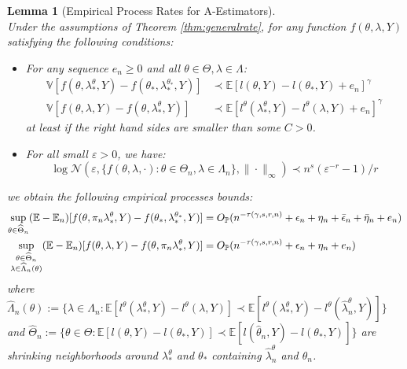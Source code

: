 \documentclass[12pt]{article}
\theoremstyle{myplain}
\newtheorem{lemma}{Lemma}[section]
\theoremstyle{definition}
\theoremstyle{definition}
\theoremstyle{remark}
\numberwithin{equation}{section}
\begin{document}
\begin{lemma}[Empirical Process Rates for A-Estimators]\label{lem:emproc} \ \\ 
Under the assumptions of Theorem \ref{thm:generalrate}, for any function $f(\theta, \lambda, Y)$ satisfying the following conditions:
\begin{itemize}
    \item For any sequence $e_n\geq0$ and all $\theta\in\Theta,\lambda\in\Lambda$: 
    \begin{align}
        \mathbb{V}[f(\theta, \lambda_*^\theta, Y)-f(\theta_*, \lambda_*^{\theta_*}, Y)] & \prec \mathbb{E}[l(\theta, Y)-l(\theta_*, Y) + e_n]^\gamma \label{assn:aloss2}\\
        \mathbb{V}[f(\theta, \lambda, Y)-f(\theta, \lambda_*^\theta, Y)] & \prec \mathbb{E}[l^\theta(\lambda_*^\theta, Y)-l^\theta(\lambda, Y) + e_n]^\gamma\label{assn:mloss2}
    \end{align}
    at least if the right hand sides are smaller than some $C>0$.
    \item For all small $\varepsilon>0$, we have:
    \begin{equation}\label{assn:entropy}
        \log \mathcal{N}(\varepsilon, \{f(\theta, \lambda, \cdot): \theta\in\Theta_n, \lambda\in\Lambda_n\}, \|\cdot\|_\infty) \prec n^{s}(\varepsilon^{-r}-1)/r 
        \end{equation}
\end{itemize}
we obtain the following empirical processes bounds:
\begin{align*}
     \sup_{\substack{\theta\in\widehat{\Theta}_n}} (\mathbb{E}-\mathbb{E}_n)[f(\theta, \pi_n\lambda_*^\theta, Y)-f(\theta_*, \lambda_*^{\theta_*}, Y)] & =O_\mathbb{P}(n^{-\tau(\gamma, s, r, n)} + \epsilon_n+\eta_n+ \Bar\epsilon_n+\Bar\eta_n+ e_n) \\
     \sup_{\substack{\theta\in\widehat\Theta_n \\ \lambda\in\widehat{\Lambda}_n(\theta)}} (\mathbb{E}-\mathbb{E}_n)[f(\theta, \lambda, Y)-f(\theta, \pi_n\lambda_*^\theta, Y)] & =O_\mathbb{P}(n^{-\tau(\gamma, s, r, n)} + \epsilon_n+\eta_n+ e_n)
\end{align*}
where $\widehat{\Lambda}_n(\theta):=\{\lambda\in\Lambda_n:\mathbb{E}[l^\theta(\lambda_*^\theta,Y)-l^\theta(\lambda, Y)]\prec \mathbb{E}[l^\theta(\lambda_*^\theta, Y)-l^\theta(\widehat{\lambda}_n^\theta,Y)]\}$ and $\widehat{\Theta}_n:=\{\theta\in\Theta: \mathbb{E}[l(\theta, Y)-l(\theta_*, Y)]\prec \mathbb{E}[l(\widehat{\theta}_n, Y)-l(\theta_*, Y)]\}$ are shrinking neighborhoods around $\lambda_*^\theta$ and $\theta_*$ containing $\widehat{\lambda}_n^\theta$ and $\widehat{\theta}_n$.

\end{lemma}
\end{document}

